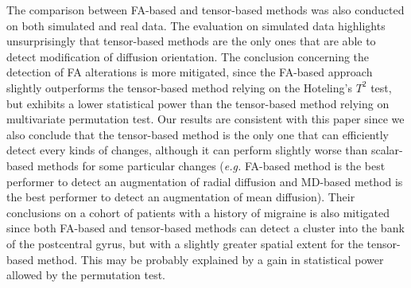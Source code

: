 The comparison between FA-based and tensor-based methods was also conducted on both simulated and real data.
The evaluation on simulated data highlights unsurprisingly that tensor-based methods are the only ones that are able to detect modification of diffusion orientation. 
The conclusion concerning the detection of FA alterations is more mitigated, since the FA-based approach slightly outperforms the tensor-based method relying on the Hoteling's $T^2$ test, 
but exhibits a lower statistical power than the tensor-based method relying on multivariate permutation test.
Our results are consistent with this paper since we also conclude that the tensor-based method is the only one that can efficiently detect every kinds of changes, 
although it can perform slightly worse than scalar-based methods for some particular changes 
(\textit{e.g.} FA-based method is the best performer to detect an augmentation of radial diffusion
and MD-based method is the best performer to detect an augmentation of mean diffusion).
Their conclusions on a cohort of patients with a history of migraine is also mitigated since both FA-based and tensor-based methods can detect
a cluster into the bank of the postcentral gyrus, but with a slightly greater spatial extent for the tensor-based method. 
This may be probably explained by a gain in statistical power allowed by the permutation test.

